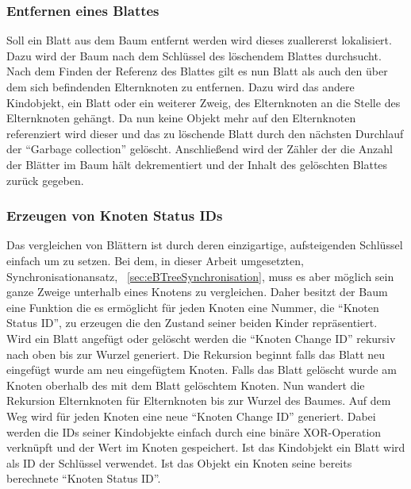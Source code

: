 \documentclass[a4paper,11pt,oneside,%
headsepline,												%
footsepline,												%
bibtotocnumbered									%
]{scrreprt}
\begin{document}
\subsubsection{Entfernen eines Blattes}
Soll ein Blatt aus dem Baum entfernt werden wird dieses zuallererst lokalisiert. Dazu wird der Baum nach dem Schlüssel des löschendem Blattes durchsucht. Nach dem Finden der Referenz des Blattes gilt es nun Blatt als auch den über dem sich befindenden Elternknoten zu entfernen. Dazu wird das andere Kindobjekt, ein Blatt oder ein weiterer Zweig, des Elternknoten an die Stelle des Elternknoten gehängt. Da nun keine Objekt mehr auf den Elternknoten referenziert wird dieser und das zu löschende Blatt durch den nächsten Durchlauf der \enquote{Garbage collection} gelöscht. Anschließend wird der Zähler der die Anzahl der Blätter im Baum hält dekrementiert und der Inhalt des gelöschten Blattes zurück gegeben.
\subsubsection{Erzeugen von Knoten Status IDs}
Das vergleichen von Blättern ist durch deren einzigartige, aufsteigenden Schlüssel einfach um zu setzen. Bei dem, in dieser Arbeit umgesetzten, Synchronisationansatz, ~\autoref{sec:eBTreeSynchronisation}, muss es aber möglich sein ganze Zweige unterhalb eines Knotens zu vergleichen. Daher besitzt der Baum eine Funktion die es ermöglicht für jeden Knoten eine Nummer, die \enquote{Knoten Status ID}, zu erzeugen die den Zustand seiner beiden Kinder repräsentiert.\\

Wird ein Blatt angefügt oder gelöscht werden die \enquote{Knoten Change ID} rekursiv nach oben bis zur Wurzel generiert.  Die Rekursion beginnt falls das Blatt neu eingefügt wurde am neu eingefügtem Knoten. Falls das Blatt gelöscht wurde am Knoten oberhalb des mit dem Blatt gelöschtem Knoten. Nun wandert die Rekursion Elternknoten für Elternknoten bis zur Wurzel des Baumes. Auf dem Weg wird für jeden Knoten eine neue \enquote{Knoten Change ID} generiert. Dabei werden die IDs seiner Kindobjekte einfach durch eine binäre XOR-Operation verknüpft und der Wert im Knoten gespeichert. Ist das Kindobjekt ein Blatt wird als ID der Schlüssel verwendet. Ist das Objekt ein Knoten seine bereits berechnete \enquote{Knoten Status ID}.
\end{document}
